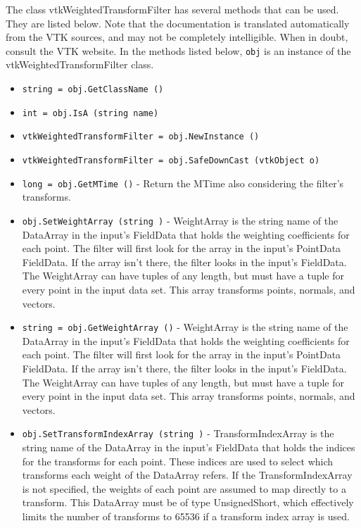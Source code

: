 The class vtkWeightedTransformFilter has several methods that can be used.
  They are listed below.
Note that the documentation is translated automatically from the VTK sources,
and may not be completely intelligible.  When in doubt, consult the VTK website.
In the methods listed below, \verb|obj| is an instance of the vtkWeightedTransformFilter class.
\begin{itemize}
\item  \verb|string = obj.GetClassName ()|

\item  \verb|int = obj.IsA (string name)|

\item  \verb|vtkWeightedTransformFilter = obj.NewInstance ()|

\item  \verb|vtkWeightedTransformFilter = obj.SafeDownCast (vtkObject o)|

\item  \verb|long = obj.GetMTime ()| -  Return the MTime also considering the filter's transforms.

\item  \verb|obj.SetWeightArray (string )| -  WeightArray is the string name of the DataArray in the input's
 FieldData that holds the weighting coefficients for each point.
 The filter will first look for the array in the input's PointData
 FieldData.  If the array isn't there, the filter looks in the
 input's FieldData.  The WeightArray can have tuples of any length,
 but must have a tuple for every point in the input data set.
 This array transforms points, normals, and vectors.

\item  \verb|string = obj.GetWeightArray ()| -  WeightArray is the string name of the DataArray in the input's
 FieldData that holds the weighting coefficients for each point.
 The filter will first look for the array in the input's PointData
 FieldData.  If the array isn't there, the filter looks in the
 input's FieldData.  The WeightArray can have tuples of any length,
 but must have a tuple for every point in the input data set.
 This array transforms points, normals, and vectors.

\item  \verb|obj.SetTransformIndexArray (string )| -  TransformIndexArray is the string name of the DataArray in the input's
 FieldData that holds the indices for the transforms for each point.
 These indices are used to select which transforms each weight of
 the DataArray refers.  If the TransformIndexArray is not specified,
 the weights of each point are assumed to map directly to a transform.
 This DataArray must be of type UnsignedShort, which effectively
 limits the number of transforms to 65536 if a transform index 
 array is used.
 

\end{itemize}
